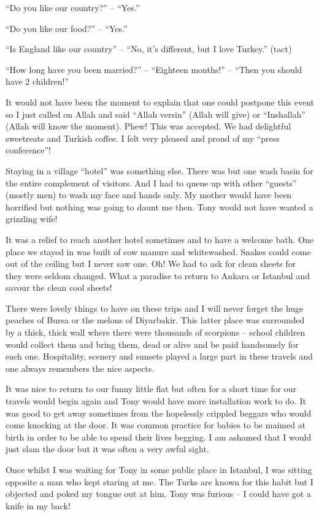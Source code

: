 ``Do you like our country?'' -- ``Yes.''

``Do you like our food?'' -- ``Yes.''

``Is England like our country'' -- ``No, it's different, but I love
Turkey.'' (tact)

``How long have you been married?'' -- ``Eighteen months!'' -- ``Then
you should have 2 children!''

It would not have been the moment to explain that one could postpone
this event so I just called on Allah and said ``Allah versin'' (Allah
will give) or ``Inshallah'' (Allah will know the moment). Phew!  This
was accepted. We had delightful sweetreats and Turkish coffee. I felt
very pleased and proud of my ``press conference''!

Staying in a village ``hotel'' was something else. There was but one
wash basin for the entire complement of visitors. And I had to queue
up with other ``guests'' (mostly men) to wash my face and hands
only. My mother would have been horrified but nothing was going to
daunt me then. Tony would not have wanted a grizzling wife!

It was a relief to reach another hotel sometimes and to have a welcome
bath. One place we stayed in was built of cow manure and
whitewashed. Snakes could come out of the ceiling but I never saw
one. Oh! We had to ask for clean sheets for they were seldom
changed. What a paradise to return to Ankara or Istanbul and savour
the clean cool sheets!

There were lovely things to have on these trips and I will never
forget the huge peaches of Bursa or the melons of Diyarbakir. This
latter place was surrounded by a thick, thick wall where there were
thousands of scorpions -- school children would collect them and bring
them, dead or alive and be paid handsomely for each one. Hospitality,
scenery and sunsets played a large part in these travels and one
always remembers the nice aspects.

It was nice to return to our funny little flat but often for a short
time for our travels would begin again and Tony would have more
installation work to do. It was good to get away sometimes from the
hopelessly crippled beggars who would come knocking at the door. It
was common practice for babies to be maimed at birth in order to be
able to spend their lives begging. I am ashamed that I would just slam
the door but it was often a very awful sight.

Once whilst I was waiting for Tony in some public place in Istanbul, I
was sitting opposite a man who kept staring at me. The Turks are known
for this habit but I objected and poked my tongue out at him. Tony was
furious -- I could have got a knife in my back!

